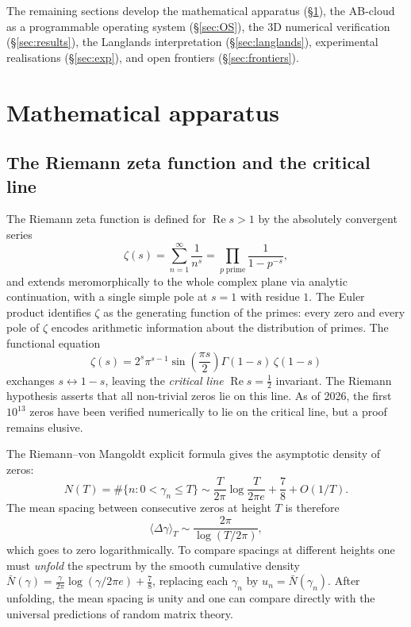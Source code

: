 \documentclass[11pt,a4paper]{article}
\theoremstyle{plain}
\theoremstyle{definition}
\theoremstyle{remark}
\begin{document}
The remaining sections develop the mathematical apparatus (\S\ref{sec:math}), the AB-cloud as a programmable operating system (\S\ref{sec:OS}), the 3D numerical verification (\S\ref{sec:results}), the Langlands interpretation (\S\ref{sec:langlands}), experimental realisations (\S\ref{sec:exp}), and open frontiers (\S\ref{sec:frontiers}).

\section{Mathematical apparatus}\label{sec:math}

\subsection{The Riemann zeta function and the critical line}

The Riemann zeta function is defined for $\operatorname{Re}s>1$ by the absolutely convergent series
\begin{equation}
    \zeta(s) = \sum_{n=1}^{\infty} \frac{1}{n^s} = \prod_{p\;\text{prime}}\frac{1}{1-p^{-s}},
\end{equation}
and extends meromorphically to the whole complex plane via analytic continuation, with a single simple pole at $s=1$ with residue $1$. The Euler product identifies $\zeta$ as the generating function of the primes: every zero and every pole of $\zeta$ encodes arithmetic information about the distribution of primes. The functional equation
\begin{equation}
    \zeta(s) = 2^s \pi^{s-1} \sin\!\left(\frac{\pi s}{2}\right) \Gamma(1-s)\,\zeta(1-s)
\end{equation}
exchanges $s\leftrightarrow 1-s$, leaving the \emph{critical line} $\operatorname{Re}s=\tfrac{1}{2}$ invariant. The Riemann hypothesis asserts that all non-trivial zeros lie on this line. As of 2026, the first $10^{13}$ zeros have been verified numerically to lie on the critical line, but a proof remains elusive.

The Riemann--von Mangoldt explicit formula gives the asymptotic density of zeros:
\begin{equation}
    N(T) = \#\{n : 0 < \gamma_n \le T\} \sim \frac{T}{2\pi}\log\!\frac{T}{2\pi e} + \frac{7}{8} + O(1/T).
\end{equation}
The mean spacing between consecutive zeros at height $T$ is therefore
\begin{equation}
    \langle \Delta\gamma \rangle_T \sim \frac{2\pi}{\log(T/2\pi)},
\end{equation}
which goes to zero logarithmically. To compare spacings at different heights one must \emph{unfold} the spectrum by the smooth cumulative density $\bar N(\gamma) = \tfrac{\gamma}{2\pi}\log(\gamma/2\pi e) + \tfrac{7}{8}$, replacing each $\gamma_n$ by $u_n = \bar N(\gamma_n)$. After unfolding, the mean spacing is unity and one can compare directly with the universal predictions of random matrix theory.
\end{document}
